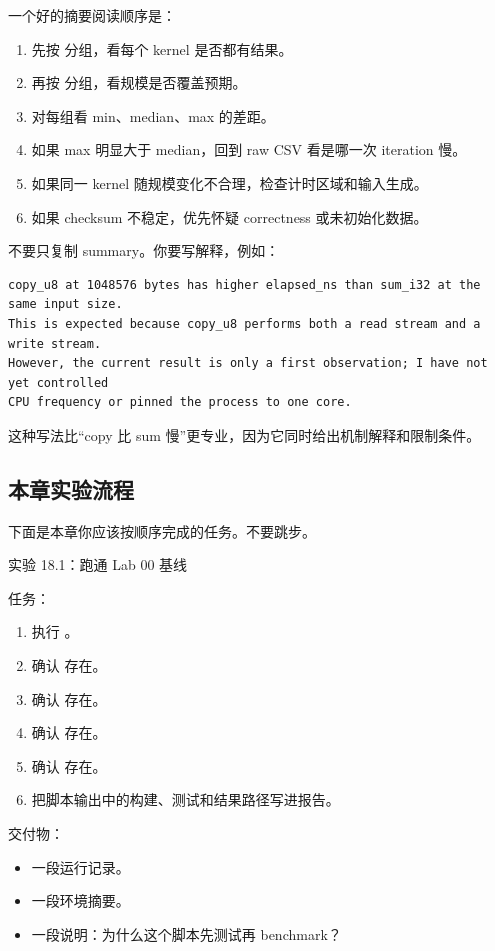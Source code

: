 一个好的摘要阅读顺序是：

\begin{enumerate}
  \item 先按  分组，看每个 kernel 是否都有结果。
  \item 再按  分组，看规模是否覆盖预期。
  \item 对每组看 min、median、max 的差距。
  \item 如果 max 明显大于 median，回到 raw CSV 看是哪一次 iteration 慢。
  \item 如果同一 kernel 随规模变化不合理，检查计时区域和输入生成。
  \item 如果 checksum 不稳定，优先怀疑 correctness 或未初始化数据。
\end{enumerate}

不要只复制 summary。你要写解释，例如：

\begin{lstlisting}
copy_u8 at 1048576 bytes has higher elapsed_ns than sum_i32 at the same input size.
This is expected because copy_u8 performs both a read stream and a write stream.
However, the current result is only a first observation; I have not yet controlled
CPU frequency or pinned the process to one core.
\end{lstlisting}

这种写法比“copy 比 sum 慢”更专业，因为它同时给出机制解释和限制条件。

\subsection{本章实验流程}

下面是本章你应该按顺序完成的任务。不要跳步。

\begin{labbox}
实验 18.1：跑通 Lab 00 基线

任务：

\begin{enumerate}
  \item 执行 。
  \item 确认  存在。
  \item 确认  存在。
  \item 确认  存在。
  \item 确认  存在。
  \item 把脚本输出中的构建、测试和结果路径写进报告。
\end{enumerate}

交付物：

\begin{itemize}
  \item 一段运行记录。
  \item 一段环境摘要。
  \item 一段说明：为什么这个脚本先测试再 benchmark？
\end{itemize}
\end{labbox}

